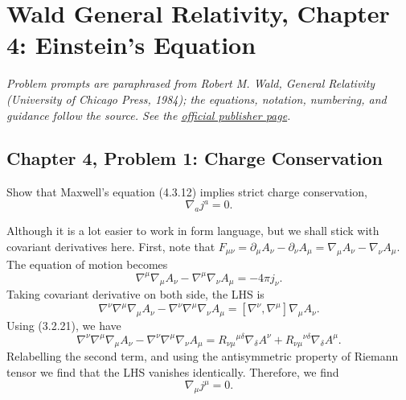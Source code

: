 \section{Wald General Relativity, Chapter 4: Einstein's Equation}

\noindent\textit{Problem prompts are paraphrased from Robert M. Wald,
\emph{General Relativity} (University of Chicago Press, 1984); the equations,
notation, numbering, and guidance follow the source. See the
\href{https://press.uchicago.edu/ucp/books/book/chicago/G/bo5952261.html}{official publisher page}.}

\subsection{Chapter 4, Problem 1: Charge Conservation}

Show that Maxwell's equation (4.3.12) implies strict charge conservation,
\begin{equation}
    \nabla_a j^a=0.
\end{equation}
\begin{solution}
    Although it is a lot easier to work in form language, but we shall stick with covariant derivatives here. First, note that $F_{\mu\nu} = \partial_\mu A_\nu - \partial_\nu A_\mu = \nabla_\mu A_\nu - \nabla_\nu A_\mu$. The equation of motion becomes
    \begin{equation}
        \nabla^\mu \nabla_\mu A_\nu -\nabla^\mu \nabla_\nu A_\mu = -4\pi j_\nu.
    \end{equation}
    Taking covariant derivative on both side, the LHS is
    \begin{equation}
        \nabla^\nu\nabla^\mu \nabla_\mu A_\nu -\nabla^\nu\nabla^\mu \nabla_\nu A_\mu = [\nabla^\nu, \nabla^\mu]\nabla_\mu A_\nu.
    \end{equation}
    Using (3.2.21), we have
    \begin{equation}
         \nabla^\nu\nabla^\mu \nabla_\mu A_\nu -\nabla^\nu\nabla^\mu \nabla_\nu A_\mu = R_{\nu\mu}{}^{\mu\delta}\nabla_\delta A^\nu +  R_{\nu\mu}{}^{\nu\delta}\nabla_\delta A^\mu.
    \end{equation}
    Relabelling the second term, and using the antisymmetric property of Riemann tensor we find that the LHS vanishes identically. Therefore, we find
    \begin{equation}
        \nabla_\mu j^\mu =0.
    \end{equation}
\end{solution}

